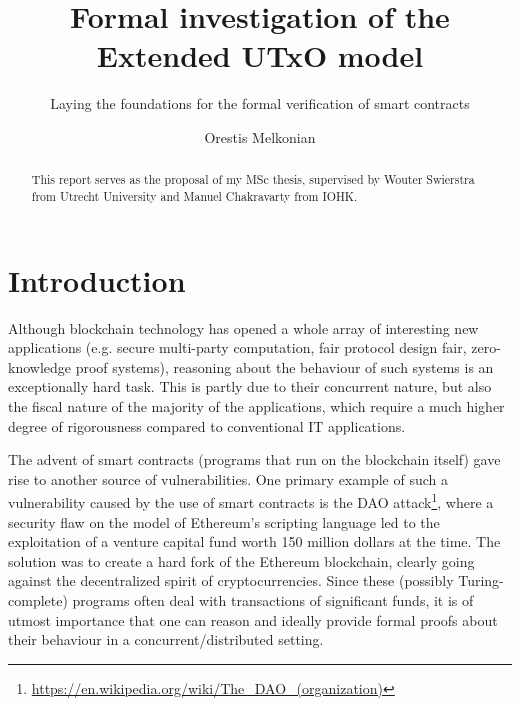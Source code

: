 \documentclass[acmsmall,nonacm=true,screen=true]{acmart}
\newcommand\site[1]{\footnote{\url{#1}}}
\begin{document}
\title{Formal investigation of the Extended UTxO model}
\subtitle{Laying the foundations for the formal verification of smart contracts}

\author{Orestis Melkonian}

\begin{abstract}
This report serves as the proposal of my MSc thesis, supervised by Wouter Swierstra from
Utrecht University and Manuel Chakravarty from IOHK.
\end{abstract}

\maketitle

\section{Introduction}
\label{sec:intro}

Although blockchain technology has opened a whole array of interesting new applications
(e.g. secure multi-party computation\cite{mpc}, fair protocol design fair\cite{fair}, zero-knowledge proof systems\cite{zeroproof}), 
reasoning about the behaviour of such systems is an exceptionally hard task. This is partly due to their concurrent nature, but
also the fiscal nature of the majority of the applications, which require a much higher degree of rigorousness compared to
conventional IT applications.

The advent of smart contracts (programs that run on the blockchain itself) gave
rise to another source of vulnerabilities.
One primary example of such a vulnerability caused by the use of smart contracts is the
DAO attack\site{https://en.wikipedia.org/wiki/The_DAO_(organization)},
where a security flaw on the model of Ethereum's scripting language led to the exploitation of a venture capital fund
worth 150 million dollars at the time.
The solution was to create a hard fork of the Ethereum blockchain, clearly going against the decentralized spirit
of cryptocurrencies.
Since these (possibly Turing-complete) programs often deal with transactions of significant funds,
it is of utmost importance that one can reason and ideally provide formal proofs about their behaviour
in a concurrent/distributed setting.
\end{document}
